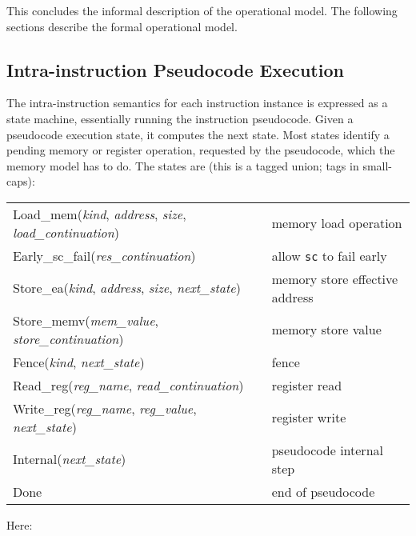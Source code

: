 This concludes the informal description of the operational model.
The following sections describe the formal operational model.

\subsection{Intra-instruction Pseudocode Execution}\label{sec:omm:pseudocode_exec}
The intra-instruction semantics for each instruction instance is expressed as a state machine, essentially running the instruction pseudocode.
Given a pseudocode execution state, it computes the next state.  Most
states identify a pending memory or register operation, requested by
the pseudocode, which the memory model has to do.  The
states are (this is a tagged union; tags in small-caps):

\begin{center}
\begin{tabular}{l@{ \quad-\quad }l}
{\sc Load\_mem}({\it kind}, {\it address}, {\it size}, {\it load\_continuation})
    & memory load operation\\
{\sc Early\_sc\_fail}({\it res\_continuation})
    & allow {\tt sc} to fail early\\
{\sc Store\_ea}({\it kind}, {\it address}, {\it size}, {\it next\_state})
    & memory store effective address\\
{\sc Store\_memv}({\it mem\_value}, {\it store\_continuation})
    & memory store value\\
{\sc Fence}({\it kind}, {\it next\_state})
    & fence\\
{\sc Read\_reg}({\it reg\_name}, {\it read\_continuation})
    & register read\\
{\sc Write\_reg}({\it reg\_name}, {\it reg\_value}, {\it next\_state})
    & register write\\
{\sc Internal}({\it next\_state})
    & pseudocode internal step\\
{\sc Done}
    & end of pseudocode\\
\end{tabular}
\end{center}
Here:
